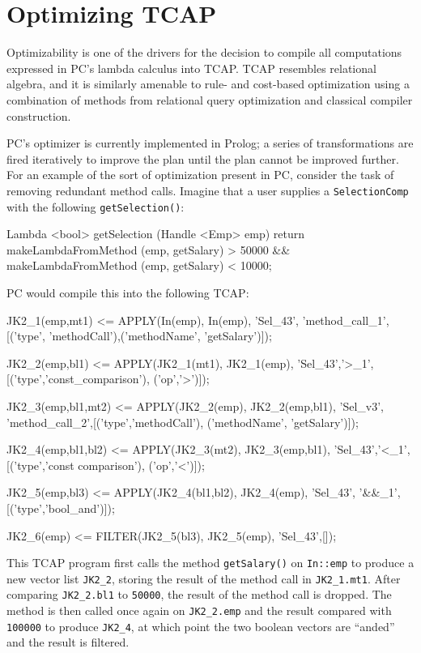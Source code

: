 
\section{Optimizing TCAP}
\label{sec:optimizer}

Optimizability is one of the drivers for
the decision to compile all computations expressed in PC's lambda calculus into TCAP.  
TCAP resembles relational algebra, and it is similarly amenable to rule- and cost-based optimization
using a combination of methods from relational query optimization and classical compiler construction.

PC's optimizer is currently implemented
in Prolog; a series of transformations are fired iteratively to improve the plan until the plan cannot be improved further.
For an example of the sort of optimization present in PC, consider the task of removing redundant method calls.  Imagine that a user
supplies a \texttt{SelectionComp} with the following \texttt{getSelection()}:

\begin{codesmall} 
Lambda <bool> getSelection (Handle  <Emp> emp) {
   return makeLambdaFromMethod
      (emp, getSalary) > 50000 &&
      makeLambdaFromMethod (emp, getSalary) < 10000;
}	
\end{codesmall}

\noindent PC would compile this into the following TCAP:

\begin{codesmall}
JK2_1(emp,mt1) <= APPLY(In(emp), In(emp), 'Sel_43',
  'method_call_1',[('type', 'methodCall'),('methodName',
  'getSalary')]);

JK2_2(emp,bl1) <= APPLY(JK2_1(mt1), JK2_1(emp), 
  'Sel_43','>_1',[('type','const_comparison'),
   ('op','>')]);

JK2_3(emp,bl1,mt2) <= APPLY(JK2_2(emp), JK2_2(emp,bl1), 
  'Sel_v3', 'method_call_2',[('type','methodCall'), 
  ('methodName', 'getSalary')]);

JK2_4(emp,bl1,bl2) <= APPLY(JK2_3(mt2), JK2_3(emp,bl1), 
  'Sel_43','<_1',[('type','const comparison'),
  ('op','<')]);

JK2_5(emp,bl3) <= APPLY(JK2_4(bl1,bl2), JK2_4(emp), 
  'Sel_43', '&&_1',[('type','bool_and')]);

JK2_6(emp) <= FILTER(JK2_5(bl3), JK2_5(emp), 'Sel_43',[]);
\end{codesmall}

\noindent
This TCAP program first calls the method \texttt{getSalary()} on \texttt{In::emp} to produce a new vector list \texttt{JK2\_2}, storing the result
of the method call in \texttt{JK2\_1.mt1}.  After comparing \texttt{JK2\_2.bl1} to \texttt{50000}, the result of the method call is dropped.
The method is then called once again on \texttt{JK2\_2.emp} and the result compared with \texttt{100000} to produce \texttt{JK2\_4}, at which 
point the two boolean vectors are ``anded'' and the result is filtered.

